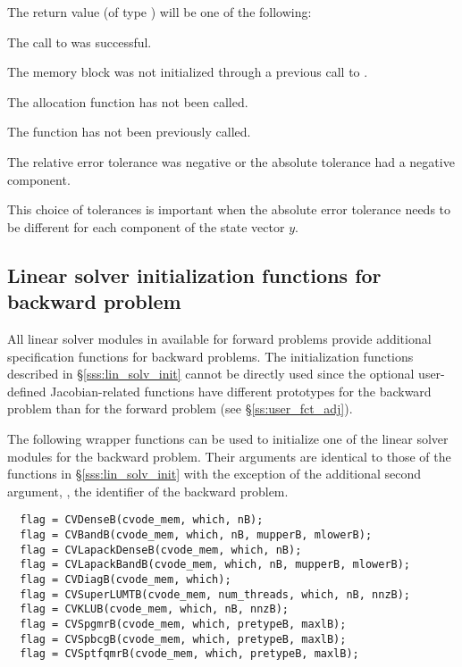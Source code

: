 {
  The return value  (of type ) will be one of the following:
  \begin{args}
  \item[\Id{CV\_SUCCESS}]
    The call to  was successful.
  \item[\Id{CV\_MEM\_NULL}] 
    The {\cvodes} memory block was not initialized through a previous call to
    .
  \item[\Id{CV\_NO\_MALLOC}] 
    The allocation function  has not been called.
  \item[\Id{CV\_NO\_ADJ}]
    The function  has not been previously called.
  \item[\Id{CV\_ILL\_INPUT}] 
    The relative error tolerance was negative or the absolute tolerance
    had a negative component.
  \end{args}
}
{
  This choice of tolerances is important when the absolute error tolerance needs to
  be different for each component of the state vector $y$.
}

\subsection{Linear solver initialization functions for backward problem}
\label{sss:lin_solv_b}

All linear solver modules in {\cvodes} available for forward problems
provide additional specification functions for backward problems.
The initialization functions described in \S\ref{sss:lin_solv_init} cannot be
directly used since the optional user-defined Jacobian-related functions have
different prototypes for the backward problem than for the forward problem
(see \S\ref{ss:user_fct_adj}). 

The following wrapper functions can be used to initialize one of the linear
solver modules for the backward problem. Their arguments are identical to those
of the functions in \S\ref{sss:lin_solv_init} with the exception of the additional
second argument, , the identifier of the backward problem.
\begin{verbatim}
  flag = CVDenseB(cvode_mem, which, nB);
  flag = CVBandB(cvode_mem, which, nB, mupperB, mlowerB);
  flag = CVLapackDenseB(cvode_mem, which, nB);
  flag = CVLapackBandB(cvode_mem, which, nB, mupperB, mlowerB);
  flag = CVDiagB(cvode_mem, which);
  flag = CVSuperLUMTB(cvode_mem, num_threads, which, nB, nnzB);
  flag = CVKLUB(cvode_mem, which, nB, nnzB);
  flag = CVSpgmrB(cvode_mem, which, pretypeB, maxlB);
  flag = CVSpbcgB(cvode_mem, which, pretypeB, maxlB);
  flag = CVSptfqmrB(cvode_mem, which, pretypeB, maxlB);
\end{verbatim}

